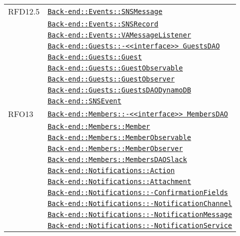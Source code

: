 \begin{longtable}{|>{\centering}m{3cm}|m{10cm}<{\centering}|}
RFD12.5 & \hyperref[Back-end::Events::SNSMessage]{\texttt{Back-end::Events::SNSMessage}}\\
& \hyperref[Back-end::Events::SNSRecord]{\texttt{Back-end::Events::SNSRecord}}\\
& \hyperref[Back-end::Events::VAMessageListener]{\texttt{Back-end::Events::VAMessageListener}}\\
& \hyperref[Back-end::Guests::<<interface>> GuestsDAO]{\texttt{Back-end::Guests::-\linebreak <<interface>> GuestsDAO}}\\
& \hyperref[Back-end::Guests::Guest]{\texttt{Back-end::Guests::Guest}}\\
& \hyperref[Back-end::Guests::GuestObservable]{\texttt{Back-end::Guests::GuestObservable}}\\
& \hyperref[Back-end::Guests::GuestObserver]{\texttt{Back-end::Guests::GuestObserver}}\\
& \hyperref[Back-end::Guests::GuestsDAODynamoDB]{\texttt{Back-end::Guests::GuestsDAODynamoDB}}\\
& \hyperref[Back-end::SNSEvent]{\texttt{Back-end::SNSEvent}}\\ \hline

RFO13 & \hyperref[Back-end::Members::<<interface>> MembersDAO]{\texttt{Back-end::Members::-\linebreak <<interface>> MembersDAO}}\\
& \hyperref[Back-end::Members::Member]{\texttt{Back-end::Members::Member}}\\
& \hyperref[Back-end::Members::MemberObservable]{\texttt{Back-end::Members::MemberObservable}}\\
& \hyperref[Back-end::Members::MemberObserver]{\texttt{Back-end::Members::MemberObserver}}\\
& \hyperref[Back-end::Members::MembersDAOSlack]{\texttt{Back-end::Members::MembersDAOSlack}}\\
& \hyperref[Back-end::Notifications::Action]{\texttt{Back-end::Notifications::Action}}\\
& \hyperref[Back-end::Notifications::Attachment]{\texttt{Back-end::Notifications::Attachment}}\\
& \hyperref[Back-end::Notifications::ConfirmationFields]{\texttt{Back-end::Notifications::-\linebreak ConfirmationFields}}\\
& \hyperref[Back-end::Notifications::NotificationChannel]{\texttt{Back-end::Notifications::-\linebreak NotificationChannel}}\\
& \hyperref[Back-end::Notifications::NotificationMessage]{\texttt{Back-end::Notifications::-\linebreak NotificationMessage}}\\
& \hyperref[Back-end::Notifications::NotificationService]{\texttt{Back-end::Notifications::-\linebreak NotificationService}}\\ \hline


\end{longtable}
